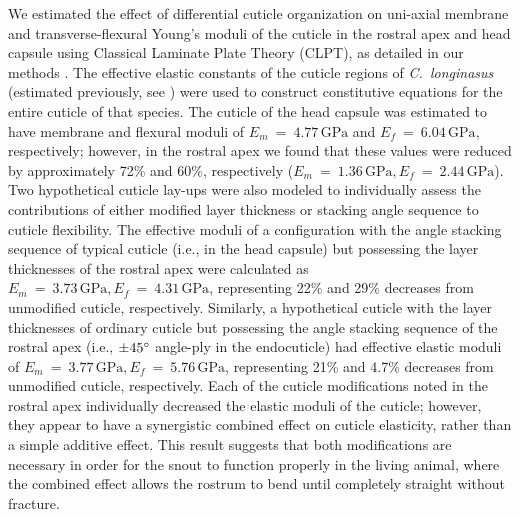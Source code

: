 \documentclass[twocolumn, linenumbers, superscriptaddress, nofootinbib]{revtex4-1}
\begin{document}
		We estimated the effect of differential cuticle organization on uni-axial membrane and transverse-flexural Young's moduli of the cuticle in the rostral apex and head capsule using Classical Laminate Plate Theory (CLPT), as detailed in our methods \cite{Reddy2004, Jones2014}.
		The effective elastic constants of the cuticle regions of \textit{C.~longinasus} (estimated previously, see \cite{Jansen2016}) were used to construct constitutive equations for the entire cuticle of that species.
		The cuticle of the head capsule was estimated to have membrane and flexural moduli of $E_m~=~4.77\,\text{GPa}$ and $E_f~=~6.04\,\text{GPa}$, respectively; however, in the rostral apex we found that these values were reduced by approximately 72\% and 60\%, respectively ($E_m~=~1.36\,\text{GPa}, E_f~=~2.44\,\text{GPa}$).
		Two hypothetical cuticle lay-ups were also modeled to individually assess the contributions of either modified layer thickness or stacking angle sequence to cuticle flexibility.
		The effective moduli of a configuration with the angle stacking sequence of typical cuticle (i.e., in the head capsule) but possessing the layer thicknesses of the rostral apex were calculated as $E_m~=~3.73\,\text{GPa}, E_f~=~4.31\,\text{GPa}$, representing 22\% and 29\% decreases from unmodified cuticle, respectively.
		Similarly, a hypothetical cuticle with the layer thicknesses of ordinary cuticle but possessing the angle stacking sequence of the rostral apex (i.e., $\pm45\degree$ angle-ply in the endocuticle) had effective elastic moduli of $E_m~=~3.77\,\text{GPa}, E_f~=~5.76\,\text{GPa}$, representing 21\% and 4.7\% decreases from unmodified cuticle, respectively.
		Each of the cuticle modifications noted in the rostral apex individually decreased the elastic moduli of the cuticle; however, they appear to have a synergistic combined effect on cuticle elasticity, rather than a simple additive effect.
		This result suggests that both modifications are necessary in order for the snout to function properly in the living animal, where the combined effect allows the rostrum to bend until completely straight without fracture.
		
\end{document}
